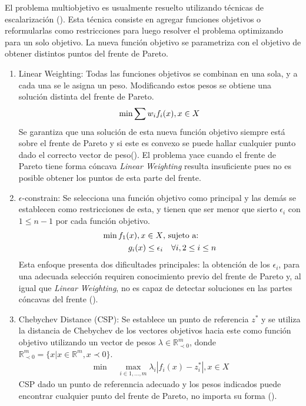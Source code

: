 El problema multiobjetivo es usualmente resuelto utilizando t\'ecnicas de escalarizaci\'on (\cite{miettinen2012nonlinear}). Esta t\'ecnica consiste  en agregar funciones objetivos o  reformularlas como restricciones para luego resolver el problema optimizando para un solo objetivo. La nueva funci\'on objetivo se parametriza con el objetivo de obtener distintos puntos del frente de Pareto.
\begin{enumerate}
    \item Linear Weighting: Todas las funciones objetivos se combinan en una sola, y a cada una se le asigna un peso. Modificando estos pesos se obtiene una soluci\'on distinta del frente de Pareto.
    \begin{equation*}
        \min \sum w_i f_i(x), \space x \in X
    \end{equation*}
    Se garantiza que una soluci\'on de esta nueva funci\'on objetivo siempre est\'a sobre el frente de Pareto  y si este es convexo se puede hallar cualquier punto  dado el correcto vector de peso(\cite{emmerich2018tutorial}). El problema yace cuando el frente de Pareto tiene forma c\'oncava \textit{Linear Weighting} resulta insuficiente pues no es posible obtener los puntos de esta parte del frente.

    \item $\epsilon$-constrain: Se selecciona una funci\'on objetivo como principal y las dem\'as se establecen como restricciones de esta, y tienen que ser menor que sierto $\epsilon_i$ con $1 \leq n - 1$ por cada funci\'on objetivo.
    \begin{align*}
            \min  f_1(x), \space x \in X  & \text{, sujeto a:}   \\
            g_i(x) \leq \epsilon_i & \quad  \forall i, 2 \leq i \leq n
    \end{align*}
    Esta enfoque presenta dos dificultades principales: la obtenci\'on de los $\epsilon_i$, para una adecuada selecci\'on requiren conocimiento previo del frente de Pareto y, al igual que \textit{Linear Weighting}, no es capaz de detectar soluciones en las partes c\'oncavas del frente (\cite{emmerich2018tutorial}).

\item Chebychev Distance (CSP): Se establece un punto de referencia $z^*$ y se utiliza la distancia de Chebychev de los vectores objetivos hacia este como funci\'on objetivo utilizando un vector de pesos $\lambda \in \mathbb{R}^m_{\prec 0}$, donde $\mathbb{R}^m_{\prec 0} = \{x | x \in \mathbb{R}^m, x \prec 0 \}$. 
    \begin{align*}
        \min \quad \max_{i \in {1,...,m}} \lambda_i |f_i(x) - z^*_i|, x \in X 
    \end{align*}
    CSP dado un punto de referenncia adecuado y los pesos indicados puede encontrar cualquier punto del frente de Pareto, no importa su forma (\cite{emmerich2018tutorial}).
\end{enumerate}

